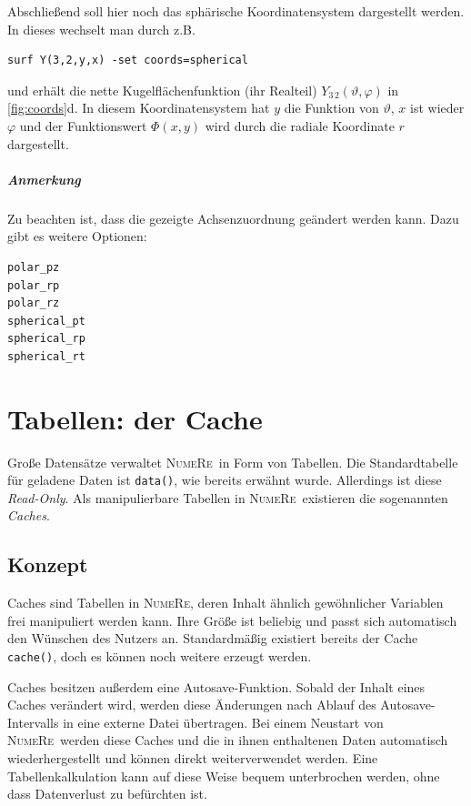 \documentclass[DIV=14,headsepline,footsepline]{scrbook}
\newcommand{\NR}{\textsc{Nu\-me\-Re}}
\begin{document}
				Abschließend soll hier noch das sphärische Koordinatensystem dargestellt werden. In dieses wechselt man durch z.B.
				\begin{lstlisting}
surf Y(3,2,y,x) -set coords=spherical
				\end{lstlisting}
				und erhält die nette Kugelflächenfunktion (ihr Realteil) $Y_{3\,2}(\vartheta,\varphi)$ in \autoref{fig:coords}d. In diesem Koordinatensystem hat $y$ die Funktion von $\vartheta$, $x$ ist wieder $\varphi$ und der Funktionswert $\Phi(x,y)$ wird durch die radiale Koordinate $r$ dargestellt.
				
				\paragraph{Anmerkung}
					Zu beachten ist, dass die gezeigte Achsenzuordnung geändert werden kann. Dazu gibt es weitere Optionen:
\begin{lstlisting}
polar_pz
polar_rp
polar_rz
spherical_pt
spherical_rp
spherical_rt
\end{lstlisting}
				
		\chapter{Tabellen: der Cache}
			Große Datensätze verwaltet \NR\ in Form von Tabellen. Die Standardtabelle für geladene Daten ist \lstinline+data()+, wie bereits erwähnt wurde. Allerdings ist diese \emph{Read-Only}. Als manipulierbare Tabellen in \NR\ existieren die sogenannten \emph{Caches}.
			\section{Konzept}
				Caches sind Tabellen in \NR, deren Inhalt ähnlich gewöhnlicher Variablen frei manipuliert werden kann. Ihre Größe ist beliebig und passt sich automatisch den Wünschen des Nutzers an. Standardmäßig existiert bereits der Cache \lstinline+cache()+, doch es können noch weitere erzeugt werden.
				
				Caches besitzen außerdem eine Autosave-Funktion. Sobald der Inhalt eines Caches verändert wird, werden diese Änderungen nach Ablauf des Autosave-Intervalls in eine externe Datei übertragen. Bei einem Neustart von \NR\ werden diese Caches und die in ihnen enthaltenen Daten automatisch wiederhergestellt und können direkt weiterverwendet werden. Eine Tabellenkalkulation kann auf diese Weise bequem unterbrochen werden, ohne dass Datenverlust zu befürchten ist.
\end{document}
